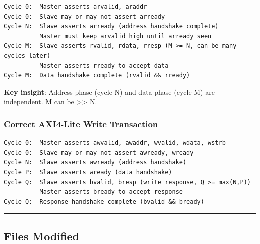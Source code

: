 \begin{record}

\begin{lstlisting}[language={}]
Cycle 0:  Master asserts arvalid, araddr
Cycle 0:  Slave may or may not assert arready
Cycle N:  Slave asserts arready (address handshake complete)
          Master must keep arvalid high until arready seen
Cycle M:  Slave asserts rvalid, rdata, rresp (M >= N, can be many cycles later)
          Master asserts rready to accept data
Cycle M:  Data handshake complete (rvalid && rready)
\end{lstlisting}

\textbf{Key insight}: Address phase (cycle N) and data phase (cycle M)
are independent. M can be \textgreater\textgreater{} N.

\end{record}

\subsubsection{Correct AXI4-Lite Write Transaction}\label{cr:fix:critical-fixes:correct-axi4-lite-write-transaction}

\begin{record}

\begin{lstlisting}[language={}]
Cycle 0:  Master asserts awvalid, awaddr, wvalid, wdata, wstrb
Cycle 0:  Slave may or may not assert awready, wready
Cycle N:  Slave asserts awready (address handshake)
Cycle P:  Slave asserts wready (data handshake)
Cycle Q:  Slave asserts bvalid, bresp (write response, Q >= max(N,P))
          Master asserts bready to accept response
Cycle Q:  Response handshake complete (bvalid && bready)
\end{lstlisting}

\begin{center}\rule{0.5\linewidth}{0.5pt}\end{center}

\end{record}

\subsection{Files Modified}\label{cr:fix:critical-fixes:files-modified}

